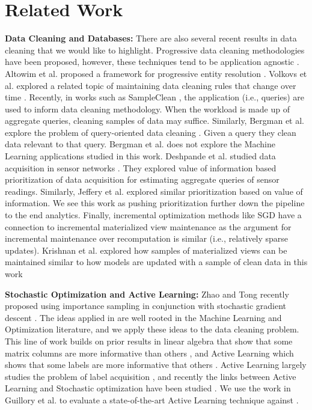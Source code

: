 \vspace{-2em}
\section{Related Work}
\noindent \textbf{Data Cleaning and Databases: } There are also several recent results in data cleaning that we would like to highlight. 
Progressive data cleaning methodologies have been proposed, however, these techniques tend to be application agnostic \cite{mayfield2010eracer}.
Altowim et al. proposed a framework for progressive entity resolution \cite{altowim2014progressive}. 
Volkovs et al. explored a related topic of maintaining data cleaning rules that change over time \cite{volkovs2014continuous}. 
Recently, in works such as SampleClean \cite{wang1999sample}, the application (i.e., queries) are used to inform data cleaning methodology.
When the workload is made up of aggregate queries, cleaning samples of data may suffice. 
Similarly, Bergman et al. explore the problem of query-oriented data cleaning \cite{DBLP:conf/sigmod/BergmanMNT15}. Given a query they clean data relevant to that query. 
Bergman et al. does not explore the Machine Learning applications studied in this work.
Deshpande et al. studied data acquisition in sensor networks \cite{deshpande2004model}. They explored value of information based prioritization of data acquisition for estimating aggregate queries of sensor readings.
Similarly, Jeffery et al. \cite{DBLP:conf/pervasive/JefferyAFHW06} explored similar prioritization based on value of information.
We see this work as pushing prioritization further down the pipeline to the end analytics.
Finally, incremental optimization methods like SGD have a connection to incremental materialized view maintenance as the argument for incremental maintenance over recomputation is similar (i.e., relatively sparse updates).
Krishnan et al. explored how samples of materialized views can be maintained similar to how models are updated with a sample of clean data in this work \cite{krishnan2015svc}

\vspace{0.25em}

\noindent \textbf{Stochastic Optimization and Active Learning: } Zhao and Tong recently proposed using importance sampling in conjunction with stochastic gradient descent \cite{zhao2014stochastic}. 
The ideas applied in \sys are well rooted in the Machine Learning and Optimization literature, and we apply these ideas to the data cleaning problem. 
This line of work builds on prior results in linear algebra that show that some matrix columns are more informative than others \cite{drineas2012fast}, and Active Learning which shows that some labels are more informative that others \cite{settles2010active}.
Active Learning largely studies the problem of label acquisition \cite{settles2010active},
and recently the links between Active Learning and Stochastic optimization have been studied \cite{guillory2009active}. 
We use the work in Guillory et al. to evaluate a state-of-the-art Active Learning technique against \sys.

